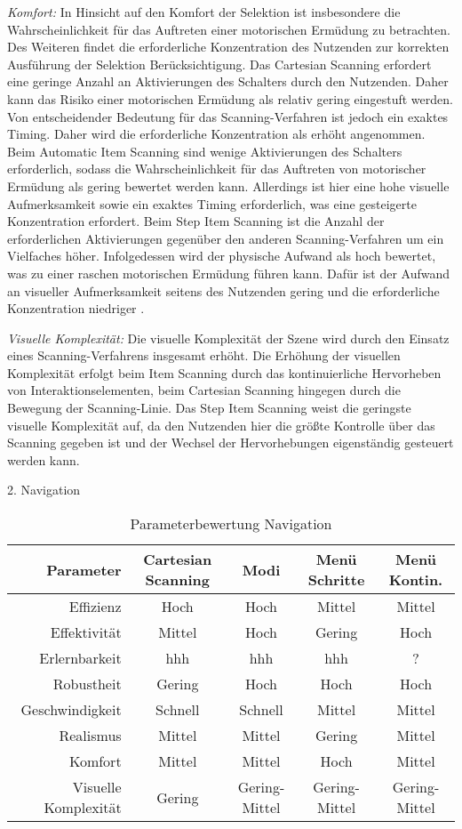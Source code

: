 \textit{Komfort:} 
In Hinsicht auf den Komfort der Selektion ist insbesondere die Wahrscheinlichkeit für das Auftreten einer motorischen Ermüdung zu betrachten. Des Weiteren findet die erforderliche Konzentration des Nutzenden zur korrekten Ausführung der Selektion Berücksichtigung. Das Cartesian Scanning erfordert eine geringe Anzahl an Aktivierungen des Schalters durch den Nutzenden. Daher kann das Risiko einer motorischen Ermüdung als relativ gering eingestuft werden. Von entscheidender Bedeutung für das Scanning-Verfahren ist jedoch ein exaktes Timing. Daher wird die erforderliche Konzentration als erhöht angenommen. 
Beim Automatic Item Scanning sind wenige Aktivierungen des Schalters erforderlich, sodass die Wahrscheinlichkeit für das Auftreten von motorischer Ermüdung als gering bewertet werden kann. Allerdings ist hier eine hohe visuelle Aufmerksamkeit sowie ein exaktes Timing erforderlich, was eine gesteigerte Konzentration erfordert. Beim Step Item Scanning ist die Anzahl der erforderlichen Aktivierungen gegenüber den anderen Scanning-Verfahren um ein Vielfaches höher. Infolgedessen wird der physische Aufwand als hoch bewertet, was zu einer raschen motorischen Ermüdung führen kann. Dafür ist der Aufwand an visueller Aufmerksamkeit seitens des Nutzenden gering und die erforderliche Konzentration niedriger \citep{COOK2015117}. 

\textit{Visuelle Komplexität:}
Die visuelle Komplexität der Szene wird durch den Einsatz eines Scanning-Verfahrens insgesamt erhöht. Die Erhöhung der visuellen Komplexität erfolgt beim Item Scanning durch das kontinuierliche Hervorheben von Interaktionselementen, beim Cartesian Scanning hingegen durch die Bewegung der Scanning-Linie. Das Step Item Scanning weist die geringste visuelle Komplexität auf, da den Nutzenden hier die größte Kontrolle über das Scanning gegeben ist und der Wechsel der Hervorhebungen eigenständig gesteuert werden kann.

2. Navigation 

\begin{table}[ht]
 \centering
 \begin{tabular}{r|c|c|c|c} 
 Parameter & Cartesian Scanning & Modi & Menü Schritte & Menü Kontin.\\
 \hline
 Effizienz & Hoch & Hoch & Mittel & Mittel\\
 Effektivität & Mittel & Hoch & Gering & Hoch\\
 Erlernbarkeit & hhh & hhh & hhh & ?\\
 Robustheit & Gering & Hoch & Hoch & Hoch\\
 Geschwindigkeit & Schnell & Schnell & Mittel & Mittel\\
 Realismus & Mittel & Mittel & Gering & Mittel \\
 Komfort & Mittel & Mittel & Hoch & Mittel\\
 Visuelle Komplexität & Gering & Gering-Mittel & Gering-Mittel & Gering-Mittel
 \end{tabular}
 \caption{Parameterbewertung Navigation}
 \label{tab:Navi}
\end{table}

